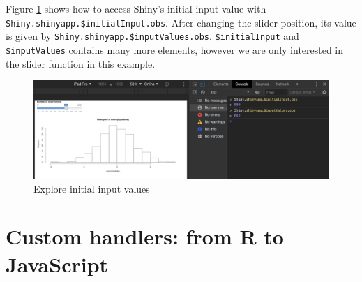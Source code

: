 \documentclass[
]{book}
\newenvironment{Shaded}{\begin{snugshade}}{\end{snugshade}}
\newcommand{\ControlFlowTok}[1]{\textcolor[rgb]{0.13,0.29,0.53}{\textbf{#1}}}
\newcommand{\DataTypeTok}[1]{\textcolor[rgb]{0.13,0.29,0.53}{#1}}
\newcommand{\DecValTok}[1]{\textcolor[rgb]{0.00,0.00,0.81}{#1}}
\newcommand{\KeywordTok}[1]{\textcolor[rgb]{0.13,0.29,0.53}{\textbf{#1}}}
\newcommand{\NormalTok}[1]{#1}
\newcommand{\OperatorTok}[1]{\textcolor[rgb]{0.81,0.36,0.00}{\textbf{#1}}}
\newcommand{\StringTok}[1]{\textcolor[rgb]{0.31,0.60,0.02}{#1}}
\begin{document}
\begin{Shaded}
\end{Shaded}

Figure \ref{fig:shiny-initial-inputs} shows how to access Shiny's initial input value with \texttt{Shiny.shinyapp.\$initialInput.obs}. After changing the slider position, its value is given by \texttt{Shiny.shinyapp.\$inputValues.obs}. \texttt{\$initialInput} and \texttt{\$inputValues} contains many more elements, however we are only interested in the slider function in this example.

\begin{figure}
\includegraphics[width=27.61in]{images/survival-kit/shiny-init-input} \caption{Explore initial input values}\label{fig:shiny-initial-inputs}
\end{figure}

\hypertarget{shiny-custom-handler}{%
\chapter{Custom handlers: from R to JavaScript}\label{shiny-custom-handler}}
\end{document}
